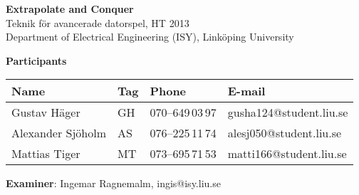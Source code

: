 \begin{center}
    \vspace*{4\baselineskip}

	\textbf{\huge Extrapolate and Conquer} \\
	\vspace*{0.5\baselineskip}
	Teknik för avancerade datorspel, HT 2013 \\
	Department of Electrical Engineering (ISY), Linköping University
	
	\vspace*{2\baselineskip}
	\textbf{\LARGE Participants}


	{\footnotesize 
	\begin{tabular}{|p{2.7cm}|p{1cm}|p{2cm}|p{3.4cm}|}
		\hline
		\textbf{Name} & \textbf{Tag} & \textbf{Phone} & \textbf{E-mail} \\
		\hline
		Gustav Häger & GH & 070--649\,03\,97 & gusha124@student.liu.se \\
		\hline
		Alexander Sjöholm & AS & 076--225\,11\,74 & alesj050@student.liu.se \\
		\hline
		Mattias Tiger & MT & 073--695\,71\,53 & matti166@student.liu.se \\
		\hline
	\end{tabular}
	}

{\footnotesize 
\vspace{0.5\baselineskip}
\vspace{1\baselineskip}

\textbf{Examiner}: Ingemar Ragnemalm, ingis@isy.liu.se \\
}

\end{center}
